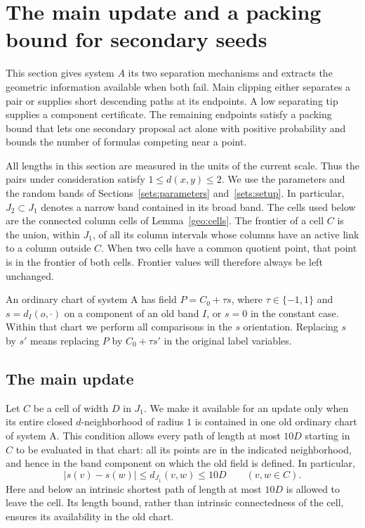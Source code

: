 \section{The main update and a packing bound for secondary seeds}
\label{main:section}

This section gives system $A$ its two separation mechanisms and extracts
the geometric information available when both fail. Main clipping either
separates a pair or supplies short descending paths at its endpoints. A
low separating tip supplies a component certificate. The remaining
endpoints satisfy a packing bound that lets one secondary proposal act
alone with positive probability and bounds the number of formulas
competing near a point.

All lengths in this section are measured in the units of the current
scale.  Thus the pairs under consideration satisfy
$1\le d(x,y)\le2$.  We use the parameters and the random bands of
Sections~\ref{sets:parameters} and~\ref{sets:setup}.  In particular,
$J_2\subset J_1$ denotes a narrow band contained in its broad band.
The cells used below are the connected column cells of
Lemma~\ref{geo:cells}.  The frontier of a cell $C$ is the union, within
$J_1$, of all its column intervals whose columns have an active link
to a column outside $C$.  When two cells have a common quotient point,
that point is in the frontier of both cells.  Frontier values will
therefore always be left unchanged.

An ordinary chart of system A has field $P=C_0+\tau s$, where
$\tau\in\{-1,1\}$ and $s=d_I(o,\cdot)$ on a component of an old band
$I$, or $s=0$ in the constant case.  Within that chart we perform all
comparisons in the $s$ orientation.  Replacing $s$ by $s'$ means
replacing $P$ by $C_0+\tau s'$ in the original label variables.

\subsection{The main update}
\label{main:update-section}

Let $C$ be a cell of width $D$ in $J_1$.  We make it available for an
update only when its entire closed $d$-neighborhood of radius $1$
is contained in one old ordinary chart of system A.  This condition
allows every path of length at most $10D$ starting in $C$ to be
evaluated in that chart: all its points are in the indicated
neighborhood, and hence in the band component on which the old field
is defined.  In particular,
\begin{equation}
 |s(v)-s(w)|\le d_{J_1}(v,w)\le10D
 \qquad(v,w\in C).
 \label{main:cell-field-variation}
\end{equation}
Here and below an intrinsic shortest path of length at most $10D$
is allowed to leave the cell.  Its length bound, rather than intrinsic
connectedness of the cell, ensures its availability in the old chart.

